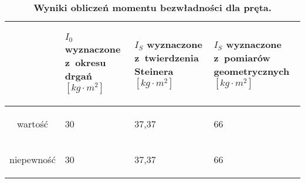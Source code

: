 \documentclass[a4paper,11pt]{article}
\begin{document}
\begin{table}[ht]
\centering
\caption{\textbf{Wyniki obliczeń momentu bezwładności dla pręta.}}
\begin{tabular}{|c|m{30mm}|m{30mm}|m{30mm}|}
\hline
& \begin{center}
\textbf{$I_{0}$ wyznaczone z~okresu drgań $[kg\cdot m^{2}]$}
\end{center} & \begin{center}
\textbf{$I_{S}$ wyznaczone z~twierdzenia Steinera $[kg\cdot m^{2}]$}
\end{center} & \begin{center}
\textbf{$I_{S}$ wyznaczone z~pomiarów geometrycznych $[kg\cdot m^{2}]$}
\end{center}  \\ \hline
wartość & \begin{center}30\end{center} & \begin{center}37,37\end{center} & \begin{center}66\end{center}\\ \hline
niepewność &\begin{center}30\end{center} & \begin{center}37,37\end{center} & \begin{center}66\end{center}\\ \hline

\end{tabular}
\end{table}
\end{document}
